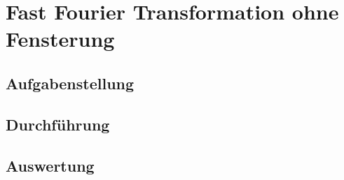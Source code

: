 \chapter{Fast Fourier Transformation ohne Fensterung}\label{CFFToF}
\section{Aufgabenstellung}\label{TFFToF}
\section{Durchführung}\label{DFFToF}
\section{Auswertung}\label{AFFToF}